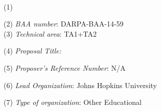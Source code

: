 




~\\
\vspace{10pt}
(1)
\begin{center}
{\Large {}}
\end{center}

\vspace{10pt}
(2) {\em BAA number}: DARPA-BAA-14-59   \\
\vspace{10pt}
\noindent (3) {\em Technical area}: TA1+TA2 %

(4) {\em Proposal Title:} 
\begin{center}
\end{center}
\vspace{10pt}

(5) {\em Proposer's Reference Number}: N/A
\vspace{10pt}

(6) {\em Lead Organization}: Johns Hopkins University %

(7) {\em Type of organization}: Other Educational

